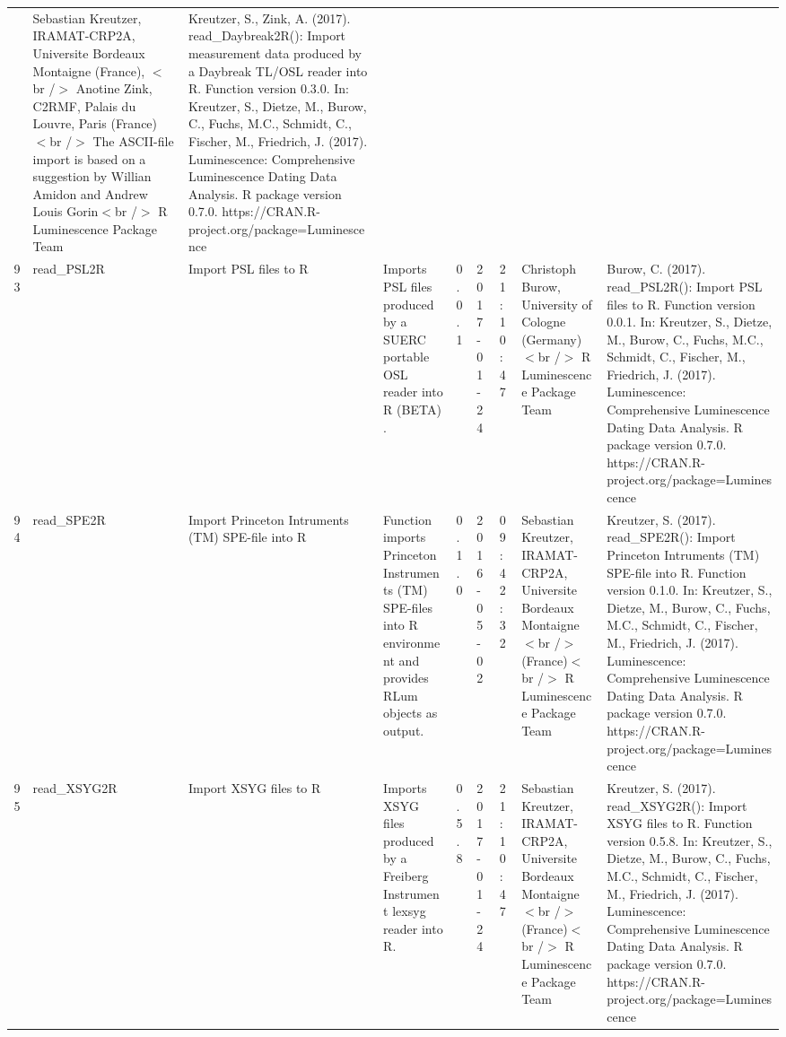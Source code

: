 \begin{table}[ht]
\begin{tabular}{rllllllll}
 & Sebastian Kreutzer, IRAMAT-CRP2A, Universite Bordeaux Montaigne (France),  $<$br /$>$ Anotine Zink, C2RMF, Palais du Louvre, Paris (France) $<$br /$>$  The ASCII-file import is based on a suggestion by Willian Amidon and Andrew Louis Gorin$<$br /$>$  R Luminescence Package Team & Kreutzer, S., Zink, A. (2017). read\_Daybreak2R(): Import measurement data produced by a Daybreak TL/OSL reader into R. Function version 0.3.0. In: Kreutzer, S., Dietze, M., Burow, C., Fuchs, M.C., Schmidt, C., Fischer, M., Friedrich, J. (2017). Luminescence: Comprehensive Luminescence Dating Data Analysis. R package version 0.7.0. https://CRAN.R-project.org/package=Luminescence
 \\ 
  93 & read\_PSL2R & Import PSL files to R & Imports PSL files produced by a SUERC portable OSL reader into R  (BETA) . & 0.0.1 & 2017-01-24 & 21:10:47
 & Christoph Burow, University of Cologne (Germany)$<$br /$>$  R Luminescence Package Team & Burow, C. (2017). read\_PSL2R(): Import PSL files to R. Function version 0.0.1. In: Kreutzer, S., Dietze, M., Burow, C., Fuchs, M.C., Schmidt, C., Fischer, M., Friedrich, J. (2017). Luminescence: Comprehensive Luminescence Dating Data Analysis. R package version 0.7.0. https://CRAN.R-project.org/package=Luminescence
 \\ 
  94 & read\_SPE2R & Import Princeton Intruments (TM) SPE-file into R & Function imports Princeton Instruments (TM) SPE-files into R environment and provides  RLum  objects as output. & 0.1.0 & 2016-05-02 & 09:42:32
 & Sebastian Kreutzer, IRAMAT-CRP2A, Universite Bordeaux Montaigne$<$br /$>$ (France)$<$br /$>$  R Luminescence Package Team & Kreutzer, S. (2017). read\_SPE2R(): Import Princeton Intruments (TM) SPE-file into R. Function version 0.1.0. In: Kreutzer, S., Dietze, M., Burow, C., Fuchs, M.C., Schmidt, C., Fischer, M., Friedrich, J. (2017). Luminescence: Comprehensive Luminescence Dating Data Analysis. R package version 0.7.0. https://CRAN.R-project.org/package=Luminescence
 \\ 
  95 & read\_XSYG2R & Import XSYG files to R & Imports XSYG files produced by a Freiberg Instrument lexsyg reader into R. & 0.5.8 & 2017-01-24 & 21:10:47
 & Sebastian Kreutzer, IRAMAT-CRP2A, Universite Bordeaux Montaigne$<$br /$>$ (France)$<$br /$>$  R Luminescence Package Team & Kreutzer, S. (2017). read\_XSYG2R(): Import XSYG files to R. Function version 0.5.8. In: Kreutzer, S., Dietze, M., Burow, C., Fuchs, M.C., Schmidt, C., Fischer, M., Friedrich, J. (2017). Luminescence: Comprehensive Luminescence Dating Data Analysis. R package version 0.7.0. https://CRAN.R-project.org/package=Luminescence

\end{tabular}
\end{table}
